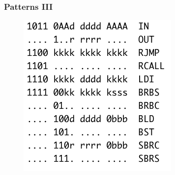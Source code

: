 \documentclass{beamer}
\begin{document}
\begin{frame}
\frametitle{Patterns III}
\begin{figure}
	\includegraphics[scale=0.43]{screen5.png}
\end{figure}
\end{frame}


\end{document}
